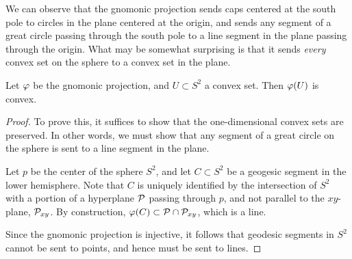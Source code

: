 We can observe that the gnomonic projection sends caps centered at the
south pole to circles in the plane centered at the origin, and sends
any segment of a great circle passing through the south pole to a line
segment in the plane passing through the origin.  What may be somewhat
surprising is that it sends \textit{every} convex set on the sphere to
a convex set in the plane.

\begin{lemma} \label{lem:gnomonic_convex}
  Let $\varphi$ be the gnomonic projection, and $U\subset S^2$ a convex 
  set. Then $\varphi(U)$ is convex.
\end{lemma}
\begin{proof}
  To prove this, it suffices to show that the one-dimensional convex
  sets are preserved. In other words, we must show that any segment of 
  a great circle on the sphere is sent to a line segment in the plane.

  Let $p$ be the center of the sphere $S^2$, and let $C\subset S^2$ be
  a geogesic segment in the lower hemisphere.  Note that $C$ is uniquely
  identified by the intersection of $S^2$ with a portion of a hyperplane
  $\mathcal{P}$ passing through $p$, and not parallel to the $xy$-plane,
  $\mathcal{P}_{xy}$. By construction, $\varphi(C)\subset \mathcal{P}\cap
  \mathcal{P}_{xy}$, which is a line. 

  Since the gnomonic projection is injective, it follows that 
  geodesic segments in $S^2$ cannot be sent to points, and hence 
  must be sent to lines.
\end{proof}

